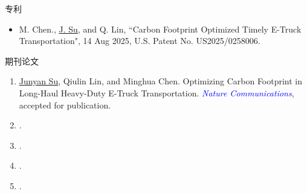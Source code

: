 \documentclass{resume} %
\begin{document}
\begin{rSection}{专利}
    \begin{itemize}
        \item M. Chen., \underline{J. Su}, and Q. Lin, ``Carbon Footprint Optimized Timely E-Truck Transportation", 14 Aug 2025, U.S. Patent No. US2025/0258006.
    \end{itemize}
\end{rSection}

\begin{rSection}{期刊论文}
    \begin{enumerate}
        \item \underline{Junyan Su}, Qiulin Lin, and Minghua Chen. Optimizing Carbon Footprint in Long-Haul Heavy-Duty E-Truck Transportation. \textcolor{blue}{\textit{Nature Communications}}, accepted for publication. 
        \item {}.
        \item {}.
        \item {}.
        \item {}.
    \end{enumerate}
\end{rSection}
\end{document}
